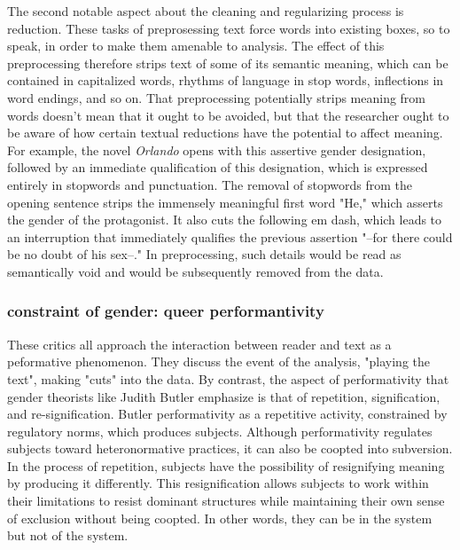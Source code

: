 \documentclass[11pt]{article}
\begin{document}
The second notable aspect about the cleaning and regularizing process
is reduction. These tasks of preprosessing text force words into
existing boxes, so to speak, in order to make them amenable to
analysis. The effect of this preprocessing therefore strips text of
some of its semantic meaning, which can be contained in capitalized
words, rhythms of language in stop words, inflections in word endings,
and so on. That preprocessing potentially strips meaning from words
doesn’t mean that it ought to be avoided, but that the researcher
ought to be aware of how certain textual reductions have the potential
to affect meaning. For example, the novel \emph{Orlando} opens with this
assertive gender designation, followed by an immediate qualification
of this designation, which is expressed entirely in stopwords and
punctuation. The removal of stopwords from the opening sentence strips
the immensely meaningful first word "He," which asserts the gender of
the protagonist. It also cuts the following em dash, which leads to an
interruption that immediately qualifies the previous assertion "--for
there could be no doubt of his sex--." In preprocessing, such details
would be read as semantically void and would be subsequently removed
from the data.

\subsubsection{constraint of gender: queer performantivity}
\label{sec:org57b4f41}
These critics all approach the interaction between reader and text as
a peformative phenomenon. They discuss the event of the analysis,
"playing the text", making "cuts" into the data. By contrast, the
aspect of performativity that gender theorists like Judith Butler
emphasize is that of repetition, signification, and
re-signification. Butler performativity as a repetitive activity,
constrained by regulatory norms, which produces subjects. Although
performativity regulates subjects toward heteronormative practices, it
can also be coopted into subversion. In the process of repetition,
subjects have the possibility of resignifying meaning by producing it
differently. This resignification allows subjects to work within their
limitations to resist dominant structures while maintaining their own
sense of exclusion without being coopted. In other words, they can be
in the system but not of the system.
\end{document}
